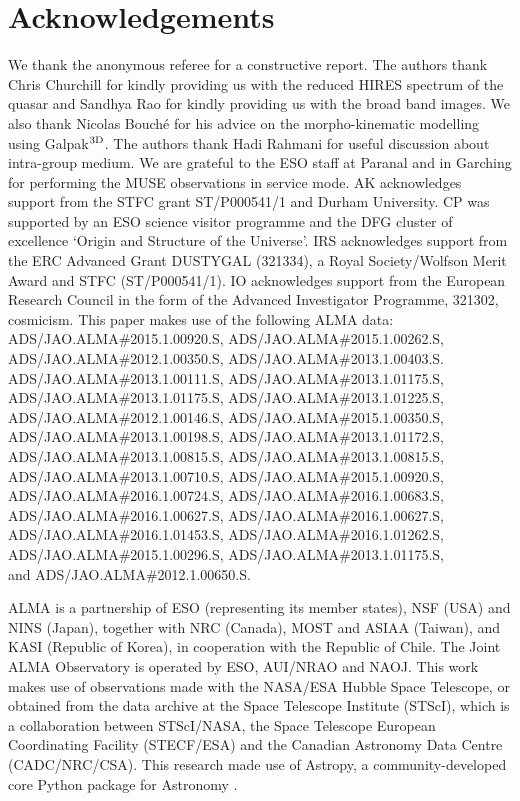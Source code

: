 \documentclass[a4paper,fleqn,usenatbib]{mnras}
\begin{document}
{\section*{Acknowledgements}

We thank the anonymous referee for a constructive report. The authors thank Chris Churchill for kindly providing us with the reduced HIRES spectrum of the quasar and Sandhya Rao for kindly providing us with the broad band images. We also thank Nicolas Bouch\'e for his advice on the morpho-kinematic modelling using Galpak$^{\rm 3D}$. The authors thank Hadi Rahmani for useful discussion about intra-group medium. We are grateful to the ESO staff at Paranal and in Garching for performing the MUSE observations in service mode. 
AK acknowledges support from the STFC grant ST/P000541/1 and Durham University. 
CP was supported by an ESO science visitor programme and the DFG cluster of excellence `Origin and Structure of the Universe'. 
IRS acknowledges support from the ERC Advanced Grant DUSTYGAL (321334), a Royal Society/Wolfson Merit Award and STFC (ST/P000541/1).
IO acknowledges support from the European Research Council in the form of the Advanced Investigator Programme, 321302, {\sc cosmicism}.
This paper makes use of the following ALMA data: \\
ADS/JAO.ALMA\#2015.1.00920.S, 
ADS/JAO.ALMA\#2015.1.00262.S, 
ADS/JAO.ALMA\#2012.1.00350.S, 
ADS/JAO.ALMA\#2013.1.00403.S. 
ADS/JAO.ALMA\#2013.1.00111.S, 
ADS/JAO.ALMA\#2013.1.01175.S,
ADS/JAO.ALMA\#2013.1.01175.S,
ADS/JAO.ALMA\#2013.1.01225.S, 
ADS/JAO.ALMA\#2012.1.00146.S, 
ADS/JAO.ALMA\#2015.1.00350.S, 
ADS/JAO.ALMA\#2013.1.00198.S, 
ADS/JAO.ALMA\#2013.1.01172.S, 
ADS/JAO.ALMA\#2013.1.00815.S, 
ADS/JAO.ALMA\#2013.1.00815.S, 
ADS/JAO.ALMA\#2013.1.00710.S, 
ADS/JAO.ALMA\#2015.1.00920.S, 
ADS/JAO.ALMA\#2016.1.00724.S, 
ADS/JAO.ALMA\#2016.1.00683.S, 
ADS/JAO.ALMA\#2016.1.00627.S, 
ADS/JAO.ALMA\#2016.1.00627.S, 
ADS/JAO.ALMA\#2016.1.01453.S, 
ADS/JAO.ALMA\#2016.1.01262.S, 
ADS/JAO.ALMA\#2015.1.00296.S,
ADS/JAO.ALMA\#2013.1.01175.S,\\
and ADS/JAO.ALMA\#2012.1.00650.S.

ALMA is a partnership of ESO (representing its member states), NSF (USA) and NINS (Japan), together with NRC (Canada), MOST and ASIAA (Taiwan), and KASI (Republic of Korea), in cooperation with the Republic of Chile. The Joint ALMA Observatory is operated by ESO, AUI/NRAO and NAOJ. This work makes use of observations made with the NASA/ESA Hubble Space Telescope, or obtained from the data archive at the Space Telescope Institute (STScI), which is a collaboration between STScI/NASA, the Space Telescope European Coordinating Facility (STECF/ESA) and the Canadian Astronomy Data Centre (CADC/NRC/CSA). This research made use of Astropy, a community-developed core Python package for Astronomy \citep{Astropy2013astropy}.


}
\end{document}
